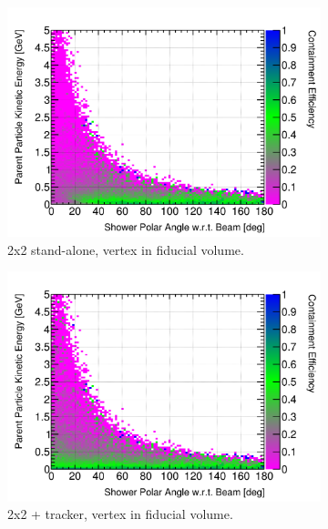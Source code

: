 \documentclass[10pt,a4paper,openany]{article}
\begin{document}
\begin{figure}[htbp]
\begin{subfigure}[b]{0.49\textwidth}
    \includegraphics[width=1.0\textwidth]{EM_cont_eff_2x2_fiducial.png}
		\caption{2x2 stand-alone, vertex in fiducial volume.}
		\label{}
	\end{subfigure}	
	\hfill
	\begin{subfigure}[b]{0.49\textwidth}
		\centering
		\includegraphics[width=1.0\textwidth]{EM_cont_eff_2x2_Scintillator_fiducial_gap.png}
		\caption{2x2 + tracker, vertex in fiducial volume.}
		\label{}
	\end{subfigure}
	\begin{subfigure}[b]{0.49\textwidth}
		\centering

\end{subfigure}
\end{figure}
\end{document}
